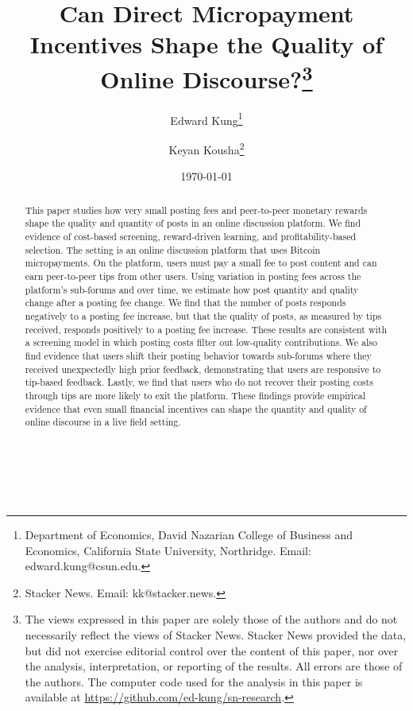 \documentclass[12pt,english,hyperfootnotes=false,hidelinks]{article}
\author{
    Edward Kung\thanks{Department of Economics, David Nazarian College of Business and Economics, California State University, Northridge. Email: edward.kung@csun.edu.} \and
    Keyan Kousha\thanks{Stacker News. Email: kk@stacker.news.}
}
\title{
Can Direct Micropayment Incentives Shape the Quality of Online Discourse?\thanks{
The views expressed in this paper are solely those of the authors and do not necessarily reflect the views of Stacker News. Stacker News provided the data, but did not exercise editorial control over the content of this paper, nor over the analysis, interpretation, or reporting of the results. All errors are those of the authors. The computer code used for the analysis in this paper is available at \url{https://github.com/ed-kung/sn-research}.
}
}
\date{\today}
\begin{document}
\maketitle

\singlespacing

\vspace{-1cm}

\begin{abstract}
This paper studies how very small posting fees and peer-to-peer monetary rewards shape the quality and quantity of posts in an online discussion platform. We find evidence of cost-based screening, reward-driven learning, and profitability-based selection. The setting is an online discussion platform that uses Bitcoin micropayments. On the platform, users must pay a small fee to post content and can earn peer-to-peer tips from other users. Using variation in posting fees across the platform's sub-forums and over time, we estimate how post quantity and quality change after a posting fee change. We find that the number of posts responds negatively to a posting fee increase, but that the quality of posts, as measured by tips received, responds positively to a posting fee increase. These results are consistent with a screening model in which posting costs filter out low-quality contributions. We also find evidence that users shift their posting behavior towards sub-forums where they received unexpectedly high prior feedback, demonstrating that users are responsive to tip-based feedback. Lastly, we find that users who do not recover their posting costs through tips are more likely to exit the platform.  These findings provide empirical evidence that even small financial incentives can shape the quantity and quality of online discourse in a live field setting.
\end{abstract}


 \\
 \\


\doublespacing

\pagebreak












\pagebreak

\pagebreak

\pagebreak

\pagebreak

%
\end{document}
